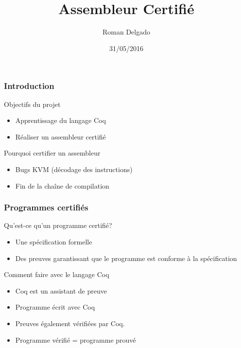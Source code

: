 \documentclass{beamer}
\title{Assembleur Certifié}
\author{Roman Delgado}
\institute[\textsc{Upmc}]{Université Pierre et Marie Curie}
\date{31/05/2016}
\begin{document}
\begin{frame}

\titlepage

\end{frame}


\begin{frame}
  \frametitle{Introduction}

  \begin{block}{Objectifs du projet}
    \begin{itemize}
    \item Apprentissage du langage Coq
    \item Réaliser un assembleur certifié
    \end{itemize}
  \end{block}

  \begin{block}{Pourquoi certifier un assembleur}
    \begin{itemize}
    \item Bugs KVM (décodage des instructions)
    \item Fin de la chaîne de compilation 
    \end{itemize}
  \end{block}   
\end{frame}
\begin{frame}[b,fragile]

\frametitle{Programmes certifiés}

\vfill

\begin{block}{Qu'est-ce qu'un programme certifié?}
  \begin{itemize}
  \item Une spécification formelle
  \item Des preuves garantissant que le programme est conforme à la spécification
  \end{itemize}
\end{block}
\begin{block}{Comment faire avec le langage Coq}
  \begin{itemize}
  \item Coq est un assistant de preuve
  \item Programme écrit avec Coq 
  \item Preuves également vérifiées par Coq.
  \item Programme vérifié = programme prouvé      
  \end{itemize}
\end{block}
\vfill


\end{frame}
\end{document}
